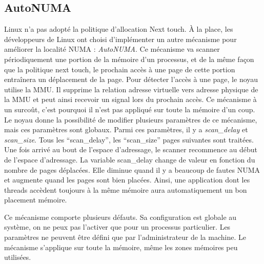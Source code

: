 \subsection{AutoNUMA}
\label{sec:autonuma}
Linux n'a pas adopté la politique d'allocation Next touch.
%
\`A la place, les développeurs de Linux ont choisi d'implémenter un autre mécanisme pour améliorer la localité NUMA : {\em AutoNUMA}.
%
Ce mécanisme va scanner périodiquement une portion de la mémoire d'un processus, et de la même façon que la politique next touch, le prochain accès à une page de cette portion entraînera un déplacement de la page.
%
Pour détecter l'accès à une page, le noyau utilise la MMU.
%
Il supprime la relation adresse virtuelle vers adresse physique de la MMU et peut ainsi recevoir un signal lors du prochain accès.
%
Ce mécanisme à un surcoût, c'est pourquoi il n'est pas appliqué sur toute la mémoire d'un coup.
%
Le noyau donne la possibilité de modifier plusieurs paramètres de ce mécanisme, mais ces paramètres sont globaux.
%
Parmi ces paramètres, il y a {\em scan\_delay} et {\em scan\_size}.
%
Tous les ``scan\_delay'', les ``scan\_size'' pages suivantes sont traitées.
%
Une fois arrivé au bout de l'espace d'adressage, le scanner recommence au début de l'espace d'adressage.
%
La variable scan\_delay change de valeur en fonction du nombre de pages déplacées.
%
Elle diminue quand il y a beaucoup de fautes NUMA et augmente quand les pages sont bien placées.
%
Ainsi, une application dont les threads accèdent toujours à la même mémoire aura automatiquement un bon placement mémoire.


Ce mécanisme comporte plusieurs défauts.
%
Sa configuration est globale au système, on ne peux pas l'activer que pour un processus particulier.
%
Les paramètres ne peuvent être défini que par l'administrateur de la machine.
%
Le mécanisme s'applique sur toute la mémoire, même les zones mémoires peu utilisées.
